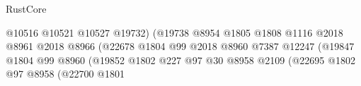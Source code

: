 \begin{lexlean}{RustCore}
\begin{coremodule}
                                                              @10516
                                                              @10521
                                                              @10527
                                                              @19732)
                                                            (@19738
                                                              @8954
                                                              @1805
                                                              @1808
                                                              @1116
                                                              @2018
                                                              @8961
                                                              @2018
                                                              @8966
                                                              (@22678
                                                                @1804
                                                                @99
                                                                @2018
                                                                @8960
                                                                @7387
                                                                @12247
                                                                (@19847
                                                                  @1804
                                                                  @99
                                                                  @8960
                                                                  (@19852
                                                                    @1802
                                                                    @227
                                                                    @97
                                                                    @30
                                                                    @8958
                                                                    @2109
                                                                    (@22695
                                                                      @1802
                                                                      @97
                                                                      @8958
                                                                      (@22700
                                                                        @1801

\end{coremodule}
\end{lexlean}
